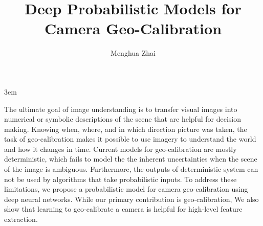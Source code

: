 \documentclass[final]{ukthesis}
\begin{document}
\emergencystretch 3em

\author{Menghua Zhai}
\title{Deep Probabilistic Models for Camera Geo-Calibration}

\abstract
{ \SingleSpacing
The ultimate goal of image understanding is to transfer visual
images into numerical or symbolic descriptions of the scene
that are helpful for decision making.
%
%
Knowing when, where, and in which direction picture was taken, the
task of geo-calibration makes it possible to use imagery to understand
the world and how it changes in time. Current models for
geo-calibration are mostly deterministic, which fails to model the
the inherent uncertainties when the scene of the image is ambiguous.
Furthermore, the outputs of deterministic system can not be used by
algorithms that take probabilistic inputs. To address these
limitations, we propose a probabilistic model for camera
geo-calibration using deep neural networks.
%
While our primary contribution is geo-calibration, We also show that
learning to geo-calibrate a camera is helpful for high-level feature
extraction.
%
}


\frontmatter
\maketitle



\tableofcontents\clearpage

\mainmatter




\backmatter




\end{document}
